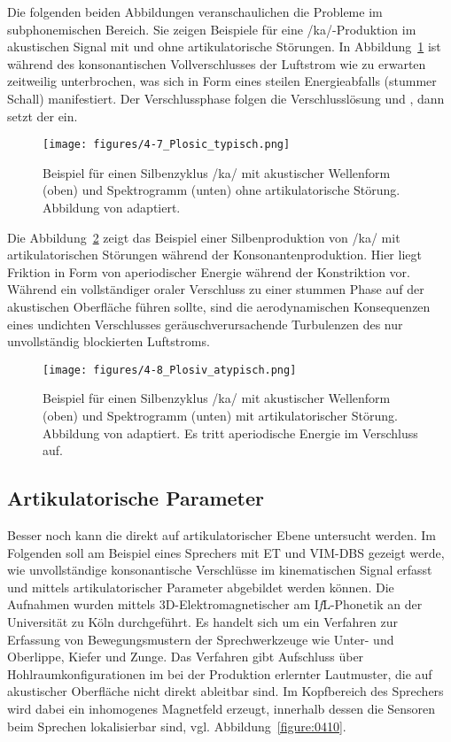 Die folgenden beiden Abbildungen veranschaulichen die Probleme im subphonemischen Bereich. Sie zeigen Beispiele für eine /ka/-Produktion im akustischen Signal mit und ohne artikulatorische Störungen. In Abbildung~\ref{figure:0408} ist während des konsonantischen Vollverschlusses der Luftstrom wie zu erwarten zeitweilig unterbrochen, was sich in Form eines steilen Energieabfalls (stummer Schall) manifestiert. Der Verschlussphase folgen die Verschlusslösung und , dann setzt der  ein.

\begin{figure}
	\texttt{[image: figures/4-7\_Plosic\_typisch.png]}
	\caption{Beispiel für einen Silbenzyklus /ka/ mit akustischer Wellenform (oben) und Spektrogramm (unten) ohne artikulatorische Störung. Abbildung von \citet{Mücke2014a} adaptiert.}
	\label{figure:0408}
\end{figure}

Die Abbildung~\ref{figure:0409} zeigt das Beispiel einer Silbenproduktion von /ka/ mit artikulatorischen Störungen während der Konsonantenproduktion. Hier liegt Friktion in Form von aperiodischer Energie während der Konstriktion vor. Während ein vollständiger oraler Verschluss zu einer stummen Phase auf der akustischen Oberfläche führen sollte, sind die aerodynamischen Konsequenzen eines undichten Verschlusses geräuschverursachende Turbulenzen des nur unvollständig blockierten Luftstroms.

\begin{figure}
	\texttt{[image: figures/4-8\_Plosiv\_atypisch.png]}
	\caption{Beispiel für einen Silbenzyklus /ka/ mit akustischer Wellenform (oben) und Spektrogramm (unten) mit artikulatorischer Störung. Abbildung von \citet{Mücke2014a} adaptiert. Es tritt aperiodische Energie im Verschluss auf.}
	\label{figure:0409}
\end{figure}

\clearpage 
\subsection{Artikulatorische Parameter}
\label{subsec:040203}

Besser noch kann die  direkt auf artikulatorischer Ebene untersucht werden. Im Folgenden soll am Beispiel eines Sprechers mit ET und VIM-DBS gezeigt werde, wie unvollständige konsonantische Verschlüsse im kinematischen Signal erfasst und mittels artikulatorischer Parameter abgebildet werden können. Die Aufnahmen wurden mittels 3D-Elektromagnetischer  am I\textit{f}L-Phonetik an der Universität zu Köln durchgeführt. Es handelt sich um ein Verfahren zur Erfassung von Bewegungsmustern der Sprechwerkzeuge wie Unter- und Oberlippe, Kiefer und Zunge. Das Verfahren gibt Aufschluss über Hohlraumkonfigurationen im  bei der Produktion erlernter Lautmuster, die auf akustischer Oberfläche nicht direkt ableitbar sind. Im Kopfbereich des Sprechers wird dabei ein inhomogenes Magnetfeld erzeugt, innerhalb dessen die Sensoren beim Sprechen lokalisierbar sind, vgl. Abbildung~\ref{figure:0410}.

